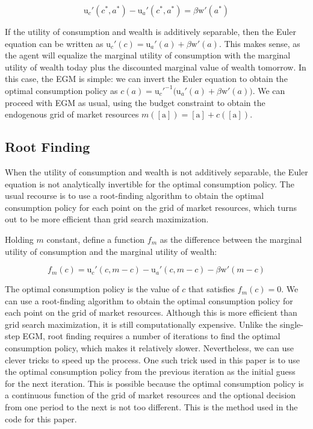 \documentclass{article}
\newcommand{\DiscFac}{\beta}
\newcommand{\uFunc}{\mathrm{u}}
\newcommand{\aNrm}{a}
\newcommand{\cNrm}{c}
\newcommand{\mNrm}{m}
\newcommand{\wFunc}{\mathrm{w}}
\newcommand{\aMat}{[\mathrm{a}]}
\begin{document}
\begin{equation}
\uFunc_{c}'(\cNrm^*, \aNrm^*) - \uFunc_{a}'(\cNrm^*, \aNrm^*) = \DiscFac \wFunc'(\aNrm^*)
\end{equation}

If the utility of consumption and wealth is additively separable, then the Euler equation can be written as $\uFunc_{c}'(\cNrm) = \uFunc_{a}'(\aNrm) + \DiscFac \wFunc'(\aNrm)$. This makes sense, as the agent will equalize the marginal utility of consumption with the marginal utility of wealth today plus the discounted marginal value of wealth tomorrow. In this case, the EGM is simple: we can invert the Euler equation to obtain the optimal consumption policy as $\cNrm(\aNrm) = \uFunc_{c}'^{ -1}\big(\uFunc_{a}'(\aNrm) + \DiscFac \wFunc'(\aNrm)\big)$. We can proceed with EGM as usual, using the budget constraint to obtain the endogenous grid of market resources $\mNrm(\aMat) = \aMat + \cNrm(\aMat)$.

\subsection{Root Finding}\label{Root Finding}

When the utility of consumption and wealth is not additively separable, the Euler equation is not analytically invertible for the optimal consumption policy. The usual recourse is to use a root-finding algorithm to obtain the optimal consumption policy for each point on the grid of market resources, which turns out to be more efficient than grid search maximization.

Holding $\mNrm$ constant, define a function $f_{m}$ as the difference between the marginal utility of consumption and the marginal utility of wealth:

\begin{equation}
f_{m}(\cNrm) = \uFunc_{c}'(\cNrm, \mNrm - \cNrm) - \uFunc_{a}'(\cNrm, \mNrm - \cNrm) - \DiscFac \wFunc'(\mNrm - \cNrm)
\end{equation}

The optimal consumption policy is the value of $\cNrm$ that satisfies $f_{m}(\cNrm) = 0$. We can use a root-finding algorithm to obtain the optimal consumption policy for each point on the grid of market resources. Although this is more efficient than grid search maximization, it is still computationally expensive. Unlike the single-step EGM, root finding requires a number of iterations to find the optimal consumption policy, which makes it relatively slower. Nevertheless, we can use clever tricks to speed up the process. One such trick used in this paper is to use the optimal consumption policy from the previous iteration as the initial guess for the next iteration. This is possible because the optimal consumption policy is a continuous function of the grid of market resources and the optional decision from one period to the next is not too different. This is the method used in the code for this paper.
\end{document}
